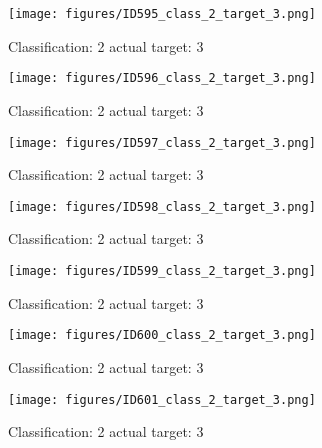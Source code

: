 \begin{figure}[h!]
\begin{center}
\texttt{[image: figures/ID595\_class\_2\_target\_3.png]}
\end{center}
\caption{ Classification: 2 actual target: 3}
\label{fig:ID595_class_2_target_3}
\end{figure}
\begin{figure}[h!]
\begin{center}
\texttt{[image: figures/ID596\_class\_2\_target\_3.png]}
\end{center}
\caption{ Classification: 2 actual target: 3}
\label{fig:ID596_class_2_target_3}
\end{figure}
\begin{figure}[h!]
\begin{center}
\texttt{[image: figures/ID597\_class\_2\_target\_3.png]}
\end{center}
\caption{ Classification: 2 actual target: 3}
\label{fig:ID597_class_2_target_3}
\end{figure}
\begin{figure}[h!]
\begin{center}
\texttt{[image: figures/ID598\_class\_2\_target\_3.png]}
\end{center}
\caption{ Classification: 2 actual target: 3}
\label{fig:ID598_class_2_target_3}
\end{figure}
\begin{figure}[h!]
\begin{center}
\texttt{[image: figures/ID599\_class\_2\_target\_3.png]}
\end{center}
\caption{ Classification: 2 actual target: 3}
\label{fig:ID599_class_2_target_3}
\end{figure}
\begin{figure}[h!]
\begin{center}
\texttt{[image: figures/ID600\_class\_2\_target\_3.png]}
\end{center}
\caption{ Classification: 2 actual target: 3}
\label{fig:ID600_class_2_target_3}
\end{figure}
\begin{figure}[h!]
\begin{center}
\texttt{[image: figures/ID601\_class\_2\_target\_3.png]}
\end{center}
\caption{ Classification: 2 actual target: 3}
\label{fig:ID601_class_2_target_3}
\end{figure}
